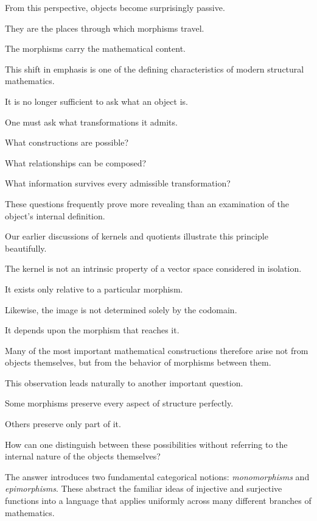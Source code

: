 \documentclass[11pt]{book}
\numberwithin{equation}{chapter}
\theoremstyle{definition}
\theoremstyle{plain}
\theoremstyle{remark}
\begin{document}
From this perspective, objects become surprisingly passive.

They are the places through which morphisms travel.

The morphisms carry the mathematical content.

This shift in emphasis is one of the defining characteristics of modern structural mathematics.

It is no longer sufficient to ask what an object is.

One must ask what transformations it admits.

What constructions are possible?

What relationships can be composed?

What information survives every admissible transformation?

These questions frequently prove more revealing than an examination of the object's internal definition.

Our earlier discussions of kernels and quotients illustrate this principle beautifully.

The kernel is not an intrinsic property of a vector space considered in isolation.

It exists only relative to a particular morphism.

Likewise, the image is not determined solely by the codomain.

It depends upon the morphism that reaches it.

Many of the most important mathematical constructions therefore arise not from objects themselves, but from the behavior of morphisms between them.

This observation leads naturally to another important question.

Some morphisms preserve every aspect of structure perfectly.

Others preserve only part of it.

How can one distinguish between these possibilities without referring to the internal nature of the objects themselves?

The answer introduces two fundamental categorical notions: \emph{monomorphisms} and \emph{epimorphisms}. These abstract the familiar ideas of injective and surjective functions into a language that applies uniformly across many different branches of mathematics.

\end{document}
